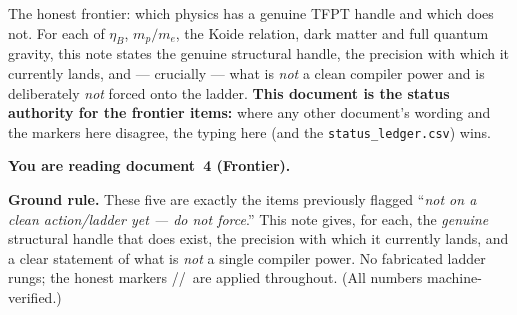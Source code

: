 
\maketitle
\vspace{-0.6cm}

\begin{keybox}
The honest frontier: which physics has a genuine TFPT handle and which does not. For each of
$\eta_B$, $m_p/m_e$, the Koide relation, dark matter and full quantum gravity, this note states the
genuine structural handle, the precision with which it currently lands, and --- crucially --- what is
\emph{not} a clean compiler power and is deliberately \emph{not} forced onto the ladder. \textbf{This
document is the status authority for the frontier items:} where any other document's wording and the
markers here disagree, the typing here (and the \texttt{status\_ledger.csv}) wins.
\end{keybox}


\noindent\textbf{You are reading \textbf{document~4} (Frontier).}


\TFPTbadges
\TFPTclaimstack[frontier]


\tableofcontents
\bigskip

\par\smallskip\noindent\textbf{Ground rule.} These five are exactly the items previously flagged
``\emph{not on a clean action/ladder yet --- do not force}.'' This note gives, for each, the
\emph{genuine} structural handle that does exist, the precision with which it currently lands, and a
clear statement of what is \emph{not} a single compiler power. No fabricated ladder rungs; the honest
markers \mE/\mC/\mO\ are applied throughout. (All numbers machine-verified.)

